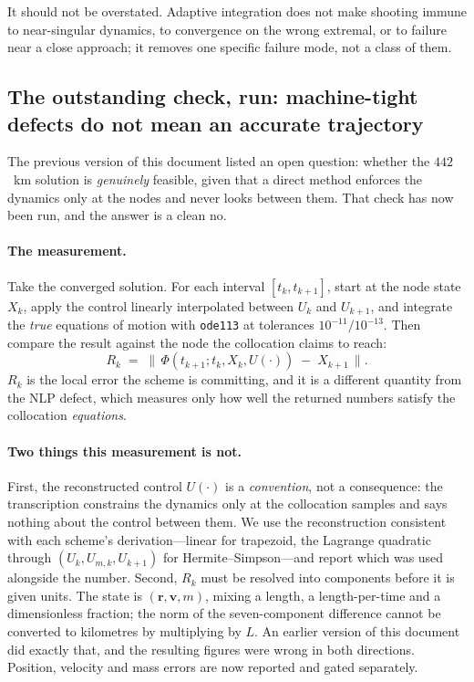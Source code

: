 \documentclass[11pt]{article}
\newcommand{\vecr}{\mathbf{r}}
\newcommand{\vecv}{\mathbf{v}}
\newcommand{\code}[1]{\texttt{#1}}
\begin{document}
It should not be overstated. Adaptive integration does not make shooting immune
to near-singular dynamics, to convergence on the wrong extremal, or to failure
near a close approach; it removes one specific failure mode, not a class of
them.

\subsection{The outstanding check, run: machine-tight defects do not mean an
accurate trajectory}
\label{sec:contres}

The previous version of this document listed an open question: whether the
$442$~km solution is \emph{genuinely} feasible, given that a direct method
enforces the dynamics only at the nodes and never looks between them. That
check has now been run, and the answer is a clean no.

\paragraph{The measurement.} Take the converged solution. For each interval
$[t_k, t_{k+1}]$, start at the node state $X_k$, apply the control linearly
interpolated between $U_k$ and $U_{k+1}$, and integrate the \emph{true}
equations of motion with \code{ode113} at tolerances $10^{-11}/10^{-13}$. Then
compare the result against the node the collocation claims to reach:
\[
  R_k \;=\; \bigl\lVert\, \Phi(t_{k+1}; t_k, X_k, U(\cdot))
                          \;-\; X_{k+1} \,\bigr\rVert .
\]
$R_k$ is the local error the scheme is committing, and it is a different
quantity from the NLP defect, which measures only how well the returned numbers
satisfy the collocation \emph{equations}.

\paragraph{Two things this measurement is not.} First, the reconstructed control
$U(\cdot)$ is a \emph{convention}, not a consequence: the transcription
constrains the dynamics only at the collocation samples and says nothing about
the control between them. We use the reconstruction consistent with each
scheme's derivation---linear for trapezoid, the Lagrange quadratic through
$(U_k, U_{m,k}, U_{k+1})$ for Hermite--Simpson---and report which was used
alongside the number. Second, $R_k$ must be resolved into components before it
is given units. The state is $(\vecr, \vecv, m)$, mixing a length, a
length-per-time and a dimensionless fraction; the norm of the seven-component
difference cannot be converted to kilometres by multiplying by $L$. An earlier
version of this document did exactly that, and the resulting figures were wrong
in both directions. Position, velocity and mass errors are now reported and
gated separately.
\end{document}
